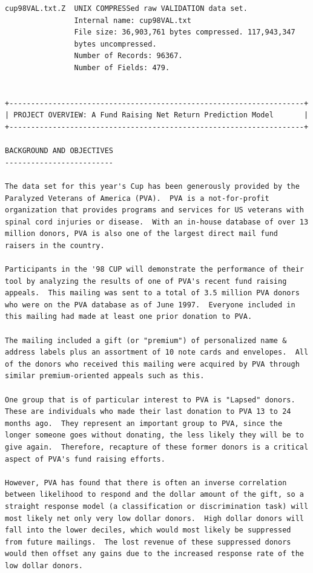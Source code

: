 \documentclass[
  11pt,
  a4paper,
  DIV=12,captions=tableheading,oneside,titlepage]{scrbook}
\begin{document}
\begin{verbatim}
cup98VAL.txt.Z  UNIX COMPRESSed raw VALIDATION data set. 
                Internal name: cup98VAL.txt 
                File size: 36,903,761 bytes compressed. 117,943,347 
                bytes uncompressed.
                Number of Records: 96367.
                Number of Fields: 479.


+--------------------------------------------------------------------+
| PROJECT OVERVIEW: A Fund Raising Net Return Prediction Model       | 
+--------------------------------------------------------------------+

BACKGROUND AND OBJECTIVES
-------------------------

The data set for this year's Cup has been generously provided by the
Paralyzed Veterans of America (PVA).  PVA is a not-for-profit
organization that provides programs and services for US veterans with
spinal cord injuries or disease.  With an in-house database of over 13
million donors, PVA is also one of the largest direct mail fund
raisers in the country.

Participants in the '98 CUP will demonstrate the performance of their
tool by analyzing the results of one of PVA's recent fund raising
appeals.  This mailing was sent to a total of 3.5 million PVA donors
who were on the PVA database as of June 1997.  Everyone included in
this mailing had made at least one prior donation to PVA.

The mailing included a gift (or "premium") of personalized name &
address labels plus an assortment of 10 note cards and envelopes.  All
of the donors who received this mailing were acquired by PVA through
similar premium-oriented appeals such as this.

One group that is of particular interest to PVA is "Lapsed" donors.
These are individuals who made their last donation to PVA 13 to 24
months ago.  They represent an important group to PVA, since the
longer someone goes without donating, the less likely they will be to
give again.  Therefore, recapture of these former donors is a critical
aspect of PVA's fund raising efforts.

However, PVA has found that there is often an inverse correlation
between likelihood to respond and the dollar amount of the gift, so a
straight response model (a classification or discrimination task) will
most likely net only very low dollar donors.  High dollar donors will
fall into the lower deciles, which would most likely be suppressed
from future mailings.  The lost revenue of these suppressed donors
would then offset any gains due to the increased response rate of the
low dollar donors.


\end{verbatim}
\end{document}
